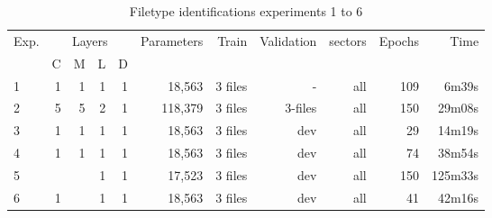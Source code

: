 \begin{table}[!ht]
    \centering
    \caption{Filetype identifications experiments 1 to 6}
    \label{tab:carving1-6}
\begin{tabular}{|l|r|r|r|r|r|r|r|r|r|r|}
\hline
Exp. & \multicolumn{4}{c|}{Layers}                                                                       & Parameters            & Train                 & Validation            & sectors               & Epochs & Time    \\ \cline{2-5}
     & \multicolumn{1}{l|}{C} & \multicolumn{1}{l|}{M} & \multicolumn{1}{l|}{L} & \multicolumn{1}{l|}{D} & \multicolumn{1}{l|}{} & \multicolumn{1}{l|}{} & \multicolumn{1}{l|}{} & \multicolumn{1}{l|}{} &        &         \\ \hline
1    & 1                      & 1                      & 1                      & 1                      & 18,563                & 3 files               & -                     & all                   & 109    & 6m39s   \\ \hline
2    & 5                      & 5                      & 2                      & 1                      & 118,379               & 3 files               & 3-files               & all                   & 150    & 29m08s  \\ \hline
3    & 1                      & 1                      & 1                      & 1                      & 18,563                & 3 files               & dev                   & all                   & 29     & 14m19s  \\ \hline
4    & 1                      & 1                      & 1                      & 1                      & 18,563                & 3 files               & dev                   & all                   & 74     & 38m54s  \\ \hline
5    &                        &                        & 1                      & 1                      & 17,523                & 3 files               & dev                   & all                   & 150    & 125m33s \\ \hline
6    & 1                      &                        & 1                      & 1                      & 18,563                & 3 files               & dev                   & all                   & 41     & 42m16s  \\ \hline
\end{tabular}
\end{table}